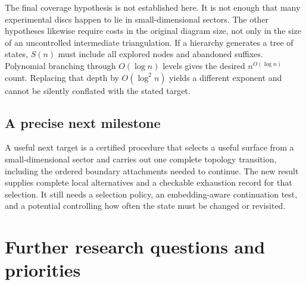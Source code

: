 \documentclass[11pt]{article}
\theoremstyle{definition}
\theoremstyle{remark}
\begin{document}
The final coverage hypothesis is not established here. It is not enough that many
experimental discs happen to lie in small-dimensional sectors. The other
hypotheses likewise require costs in the original diagram size, not
only in the size of an uncontrolled intermediate triangulation. If a
hierarchy generates a tree of states, $S(n)$ must include all explored nodes
and abandoned suffixes. Polynomial branching through $O(\log n)$ levels
gives the desired $n^{O(\log n)}$ count. Replacing that depth by
$O(\log^2 n)$ yields a different exponent and cannot be silently conflated
with the stated target.

\subsection{A precise next milestone}

A useful next target is a certified procedure that selects a useful surface
from a small-dimensional sector and carries out one complete topology
transition, including the ordered boundary attachments needed to continue.
The new result supplies complete local alternatives and a checkable
exhaustion record for that selection. It still needs a selection policy, an
embedding-aware continuation test, and a potential controlling how often
the state must be changed or revisited.

\section{Further research questions and priorities}
\label{sec:research}
\end{document}
